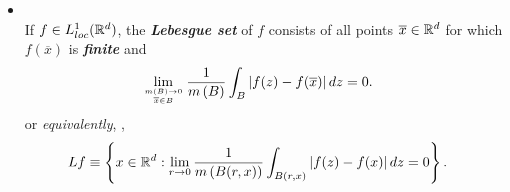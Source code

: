 \documentclass[11pt]{article}
\begin{document}
\begin{itemize}
\begin{proof}
Given $\epsilon >0$, we know that there exists a continuous integrable function $g$ such that $\int \abs{g(z)- f(z)}dz$ $<\epsilon $. Continuity of $g$ implies that for every $x\in \bR^{d}$ and $\delta >0$, there exists $r>0$ such that $\abs{g(y)- g(z)}<\delta$ whenever $\abs{y-x}<r$, and hence, 
\begin{align*}
\abs{A_{r}g(x) - g(x) }&= \frac{1}{m\paren{B(r,x)}}\abs{\int_{B(r,x)}\brac{g(z)- g(x)}dz}<\delta. 
\end{align*}
Therefore $A_{r}g(x) \rightarrow g(x)$ as $r\rightarrow 0$ for every $x$, so
\begin{align*}
\limsup\limits_{r\rightarrow 0}\abs{A_{r}f(x) - f(x)}
&= \limsup\limits_{r\rightarrow 0}\abs{A_{r}(f-g)(x)+  A_{r}g(x) - g(x) + g(x)- f(x)}\\
&\le H(f-g)(x)+ 0+ \abs{f-g}(x).
\end{align*}
Hence, if
\begin{align*}
F_{\alpha} &= \set{x: \limsup\limits_{r\rightarrow 0}\abs{A_{r}f(x) - f(x)}>\alpha}, \\
G_{\alpha} &=  \set{x: \abs{f-g}(x)>\alpha},
\end{align*}
we have 
\begin{align*}
F_{\alpha} \subset G_{\alpha/2} \cup \set{x: H(f-g)>\alpha/2}.
\end{align*}
But $\frac{\alpha}{2} m(G_{\alpha/2} ) \le \int_{G_{\alpha/2}}\abs{f(x)- g(x)}dx < \epsilon$, so by the maximal theorem, 
\begin{align*}
m(F_{\alpha}) &\le \frac{2\epsilon}{\alpha}+ \frac{2A\epsilon}{\alpha}.
\end{align*}
Since $\epsilon>0$ is arbitrary, $m(F_{\alpha})=0$ for all $\alpha>0$. But $\lim\limits_{r\rightarrow 0}A_{r}f(x)= f(x)$ for all $x\in \bigcup_{n=1}^{\infty}E_{1/n}$, so we have done. \qed
\end{proof}

\item \begin{definition}\citep{stein2009real}\\
If $f\in L_{loc}^{1}({\mathbb R}^{d})$, the \emph{\textbf{Lebesgue set}} of $f$ consists of all points $\overline{x}\in {\mathbb R}^{d}$ for which $f(\overline{x})$ is \emph{\textbf{finite}} and 
\begin{align*}
\lim\limits_{m(B)\rightarrow 0\atop \overline{x}\in B}\frac{1}{m\left(B\right)}\int_{B}\left\lvert f(z)- f(\overline{x}) \right\rvert dz &= 0.
\end{align*}
or \emph{equivalently}, \citep{folland2013real},
\begin{align*}
Lf &\equiv\left\{x\in {\mathbb R}^{d}: \lim\limits_{r\rightarrow 0}\frac{1}{m\left(B(r,x)\right)}\int_{B(r,x)}\left\lvert f(z)- f(x) \right\rvert dz = 0\right\}.
\end{align*}
\end{definition}


\end{itemize}
\end{document}
